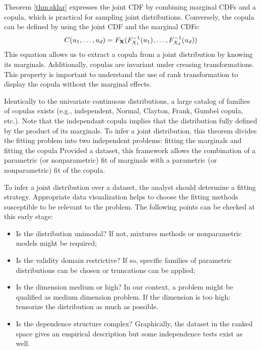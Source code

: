 Theorem \ref{thm:sklar} expresses the joint CDF by combining marginal CDFs and a copula, which is practical for sampling joint distributions. 
Conversely, the copula can be defined by using the joint CDF and the marginal CDFs: 
\begin{equation}
    C(u_1, \dots, u_d) = F_{{\bf X}}(F^{-1}_{X_1}(u_1), \dots, F^{-1}_{X_d}(u_d))
\end{equation}
This equation allows us to extract a copula from a joint distribution by knowing its marginals.
Additionally, copulas are invariant under creasing transformations. 
This property is important to understand the use of rank transformation to display the copula without the marginal effects.     

Identically to the univariate continuous distributions, a large catalog of families of copulas exists (e.g., independent, Normal, Clayton, Frank, Gumbel copula, etc.).
Note that the independant copula implies that the distribution fully defined by the product of its marginals.
To infer a joint distribution, this theorem divides the fitting problem into two independent problems: fitting the marginals and fitting the copula
Provided a dataset, this framework allows the combination of a parametric (or nonparametric) fit of marginals with a parametric (or nonparametric) fit of the copula. 

To infer a joint distribution over a dataset, the analyst should determine a fitting strategy.
Appropriate data visualization helps to choose the fitting methods susceptible to be relevant to the problem. 
The following points can be checked at this early stage:  
\begin{itemize}
    \item Is the distribution unimodal? If not, mixtures methods or nonparametric models might be required;
    \item Is the validity domain restrictive? If so, specific families of parametric distributions can be chosen or truncations can be applied;
    \item Is the dimension medium or high? In our context, a problem  might be qualified as medium dimension problem. If the dimension is too high: tensorize the distribution as much as possible.
    \item Is the dependence structure complex? Graphically, the dataset in the ranked space gives an empirical description but some independence tests exist as well. 
\end{itemize} 


